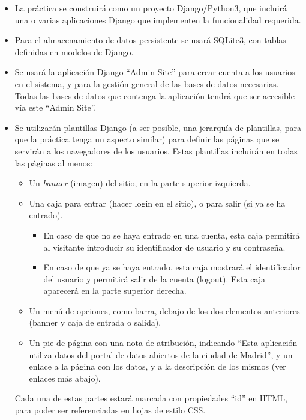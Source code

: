\begin{itemize}

  \item La práctica se construirá como un proyecto Django/Python3, que incluirá una o varias aplicaciones Django que implementen la funcionalidad requerida.

  \item Para el almacenamiento de datos persistente se usará SQLite3, con tablas definidas en modelos de Django.

  \item Se usará la aplicación Django ``Admin Site'' para crear cuenta a los usuarios en el sistema, y para la gestión general de las bases de datos necesarias. Todas las bases de datos que contenga la aplicación tendrá que ser accesible vía este ``Admin Site''.

  \item Se utilizarán plantillas Django (a ser posible, una jerarquía de plantillas, para que la práctica tenga un aspecto similar) para definir las páginas que se servirán a los navegadores de los usuarios. Estas plantillas incluirán en todas las páginas al menos:
  \begin{itemize}
  \item Un \emph{banner} (imagen) del sitio, en la parte superior izquierda.
  \item Una caja para entrar (hacer login en el sitio), o para salir (si ya se ha entrado).
  \begin{itemize}
    \item En caso de que no se haya entrado en una cuenta, esta caja permitirá al visitante introducir su identificador de usuario y su contraseña. 
    \item En caso de que ya se haya entrado, esta caja mostrará el identificador del usuario y permitirá salir de la cuenta (logout). Esta caja aparecerá en la parte superior derecha.
  \end{itemize}
  \item Un menú de opciones, como barra, debajo de los dos elementos anteriores (banner y caja de entrada o salida).
  \item Un pie de página con una nota de atribución, indicando ``Esta aplicación utiliza datos del portal de datos abiertos de la ciudad de Madrid'', y un enlace a la página con los datos, y a la descripción de los mismos (ver enlaces más abajo).
  \end{itemize}

Cada una de estas partes estará marcada con propiedades ``id'' en HTML, para poder ser referenciadas en hojas de estilo CSS.


\end{itemize}
